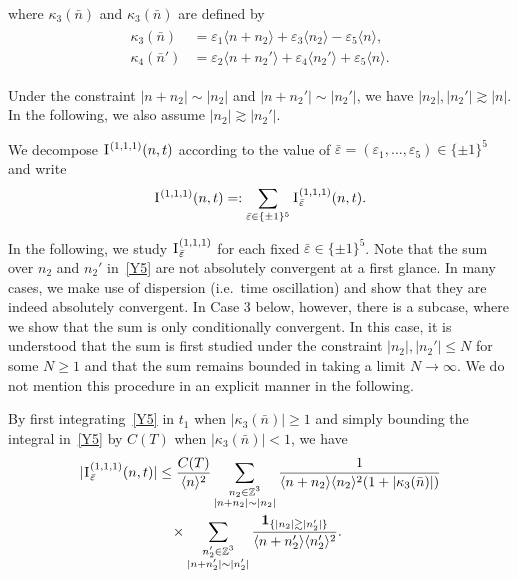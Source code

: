 \documentclass[%
11pt,  reqno]{amsart}
\newcommand{\1}{\hspace{0.2mm}\text{I}\hspace{0.2mm}}
\newcommand{\noi}{\noindent}
\newcommand{\Z}{\mathbb{Z}}
\newcommand{\eps}{\varepsilon}
\newcommand{\kk}{\kappa}
\newcommand{\ges}{\gtrsim}
\newcommand{\jb}[1]
{\langle #1 \rangle}
\newcommand{\ind}{\mathbf 1}
\numberwithin{equation}{section}
\numberwithin{theorem}{section}
\begin{document}
\noi
where
$\kk_3(\bar n)$ and $\kk_3(\bar n)$ are defined by 
\begin{align}
\begin{split}
\kk_3(\bar n) 
& = \eps_1 \jb{n+n_2}  
+ \eps_3  \jb{n_2}
 - \eps_5  \jb{n}, \\
\kk_4(\bar n') 
& = 
 \eps_2  \jb{n+n_2'}
+  \eps_4  \jb{n_2'}
+  \eps_5  \jb{n}.
\end{split}
\label{Y6}
\end{align}
%
%

\noi
Under the constraint $|n+ n_2 |\sim |n_2|$
and $|n+ n_2'| \sim |n_2'|$, 
we have $|n_2 |, |n_2'| \ges |n|$.
In the following, we also assume 
$|n_2| \ges |n_2'|$.



We   decompose $\1^{(1,1,1)} (n,t)$ according to the value of
 $\bar \eps = (\eps_1, \dots, \eps_5)\in\{\pm 1\}^5$ and write
\[
\1^{(1,1,1)} (n,t) =:\sum_{\bar\eps \in \{\pm 1\}^5 } \1^{(1,1,1)}_{\bar \eps} (n,t).
\]

\noi
In the following, we study $\1^{(1,1,1)}_{\bar \eps} $
for each fixed $\bar \eps\in\{\pm 1\}^5$.
Note that the sum over $n_2$ and $n_2'$ in~\eqref{Y5} are not absolutely convergent
at a first glance.
In many cases, we make use of dispersion (i.e.~time oscillation)
and show that they are indeed absolutely convergent.
In Case 3 below, however, there is a subcase,
where we show that the sum is only conditionally convergent.
In this case, it is understood that the sum is first studied
under the constraint $|n_2|, |n_2'| \leq N$ for some $N \geq 1$
and that the sum remains bounded in taking a limit $N \to \infty$.
We do not mention this procedure in an explicit manner
in the following.

By first  integrating~\eqref{Y5} in $t_1$
when  $|\kk_3(\bar n)|\geq 1$
and simply bounding the integral in~\eqref{Y5} by $C(T)$
when  $|\kk_3(\bar n)|<  1$, 
we have
\begin{align}
\begin{split}
|\1^{(1,1,1)}_{\bar \eps} (n,t)|
& \le \frac{C(T)}{\jb{n}^2}
\sum_{\substack{n_2 \in \Z^3\\|n + n_2| \sim |n_2|}} 
\frac{1}
{ \jb{n+n_2} \jb{n_2}^2 (1+ |\kk_3(\bar n)|)}\\
& \hphantom{X}
\times
\sum_{\substack{n'_2 \in \Z^3\\|n + n'_2| \sim |n'_2|}}
\frac{\ind_{\{|n_2| \ges |n_2'|\}}}
{ \jb{n+n_2'} \jb{n_2'}^2}.
\end{split}
\label{Y7}
\end{align}
\end{document}
